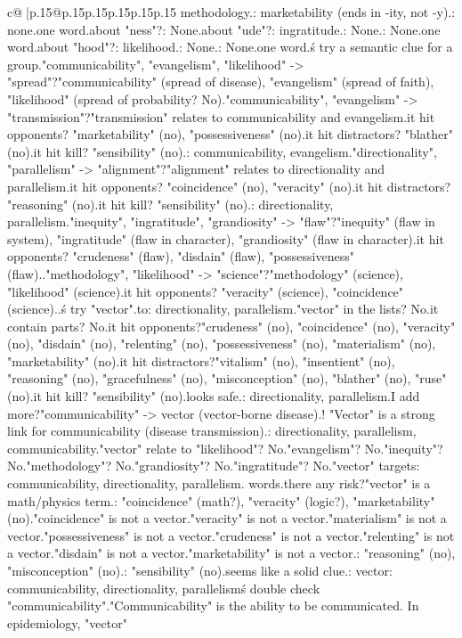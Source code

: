 \documentclass{article}
\begin{document}
{\begin{supertabular}{c@{$\;$}|p{.15\linewidth}@{}p{.15\linewidth}p{.15\linewidth}p{.15\linewidth}p{.15\linewidth}p{.15\linewidth}}
{{{methodology.\nOpponent: marketability (ends in -ity, not -y).\nDistractor: none.\nOnly one word.\n\nWhat about "ness"?\nMy: None.\n\nWhat about "ude"?\nMy: ingratitude.\nOpponent: None.\nDistractor: None.\nOnly one word.\n\nWhat about "hood"?\nMy: likelihood.\nOpponent: None.\nDistractor: None.\nOnly one word.\n\nLet\'s try a semantic clue for a group.\n"communicability", "evangelism", "likelihood" -> "spread"?\n"communicability" (spread of disease), "evangelism" (spread of faith), "likelihood" (spread of probability? No).\n"communicability", "evangelism" -> "transmission"?\n"transmission" relates to communicability and evangelism.\nDoes it hit opponents? "marketability" (no), "possessiveness" (no).\nDoes it hit distractors? "blather" (no).\nDoes it hit kill? "sensibility" (no).\nTargets: communicability, evangelism.\n\n"directionality", "parallelism" -> "alignment"?\n"alignment" relates to directionality and parallelism.\nDoes it hit opponents? "coincidence" (no), "veracity" (no).\nDoes it hit distractors? "reasoning" (no).\nDoes it hit kill? "sensibility" (no).\nTargets: directionality, parallelism.\n\n"inequity", "ingratitude", "grandiosity" -> "flaw"?\n"inequity" (flaw in system), "ingratitude" (flaw in character), "grandiosity" (flaw in character).\nDoes it hit opponents? "crudeness" (flaw), "disdain" (flaw), "possessiveness" (flaw).\nRisk.\n\n"methodology", "likelihood" -> "science"?\n"methodology" (science), "likelihood" (science).\nDoes it hit opponents? "veracity" (science), "coincidence" (science).\nRisk.\n\nLet\'s try "vector".\nRelates to: directionality, parallelism.\nIs "vector" in the lists? No.\nDoes it contain parts? No.\nDoes it hit opponents?\n"crudeness" (no), "coincidence" (no), "veracity" (no), "disdain" (no), "relenting" (no), "possessiveness" (no), "materialism" (no), "marketability" (no).\nDoes it hit distractors?\n"vitalism" (no), "insentient" (no), "reasoning" (no), "gracefulness" (no), "misconception" (no), "blather" (no), "ruse" (no).\nDoes it hit kill? "sensibility" (no).\nThis looks safe.\nTargets: directionality, parallelism.\n\nCan I add more?\n"communicability" -> vector (vector-borne disease).\nYes! "Vector" is a strong link for communicability (disease transmission).\nSo: directionality, parallelism, communicability.\nDoes "vector" relate to "likelihood"? No.\n"evangelism"? No.\n"inequity"? No.\n"methodology"? No.\n"grandiosity"? No.\n"ingratitude"? No.\n\nSo "vector" targets: communicability, directionality, parallelism. words.\nIs there any risk?\n"vector" is a math/physics term.\nOpponents: "coincidence" (math?), "veracity" (logic?), "marketability" (no).\n"coincidence" is not a vector.\n"veracity" is not a vector.\n"materialism" is not a vector.\n"possessiveness" is not a vector.\n"crudeness" is not a vector.\n"relenting" is not a vector.\n"disdain" is not a vector.\n"marketability" is not a vector.\nDistractors: "reasoning" (no), "misconception" (no).\nKill: "sensibility" (no).\n\nThis seems like a solid clue.\nClue: vector\nTargets: communicability, directionality, parallelism\n\nLet\'s double check "communicability".\n"Communicability" is the ability to be communicated. In epidemiology, "vector" }}}
\end{supertabular}}
\end{document}
